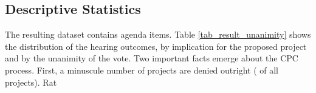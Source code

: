 \subsection{Descriptive Statistics} \label{sec_descriptive_statistics}

The resulting dataset contains  agenda items. Table \ref{tab_result_unanimity} shows the distribution of the hearing outcomes, by implication for the proposed project and by the unanimity of the vote. Two important facts emerge about the CPC process. First, a minuscule number of projects are denied outright ( of all projects). Rat
